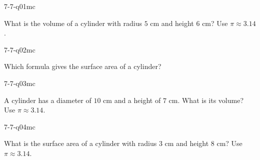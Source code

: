 

\begin{practiceQuestion}{7-7-q01}{mc}
\begin{questionText}
What is the volume of a cylinder with radius $5$ cm and height $6$ cm? Use $\pi \approx 3.14$.
\end{questionText}
\end{practiceQuestion}

\begin{practiceQuestion}{7-7-q02}{mc}
\begin{questionText}
Which formula gives the surface area of a cylinder?
\end{questionText}
\end{practiceQuestion}

\begin{practiceQuestion}{7-7-q03}{mc}
\begin{questionText}
A cylinder has a diameter of $10$ cm and a height of $7$ cm. What is its volume? Use $\pi \approx 3.14$.
\end{questionText}
\end{practiceQuestion}

\begin{practiceQuestion}{7-7-q04}{mc}
\begin{questionText}
What is the surface area of a cylinder with radius $3$ cm and height $8$ cm? Use $\pi \approx 3.14$.
\end{questionText}
\end{practiceQuestion}

